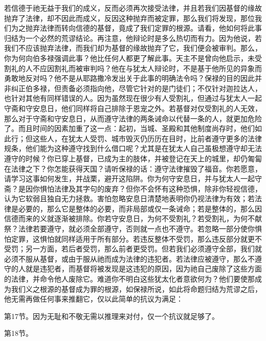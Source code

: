 若信德于祂无益于我们的成义，反而必须再次接受法律，并且若我们因基督的缘故抛弃了法律，却不因此而成义，反因这种抛弃而被定罪，那么我们将发现，那位我们为之抛弃法律而转向信德的基督，竟成了我们定罪的根源。请看，他如何将此事归结为一个必然的荒谬结论。再注意，他辩论时是多么热切而有力。因为他说，若我们不应该抛弃法律，而我们却为基督的缘故抛弃了它，我们便会被审判。那么，你为何向伯多禄强调此事？他比任何人都更了解此事。天主不是曾向他启示，未受割礼的人不应因割礼而被审判吗？他在与犹太人辩论时，不是基于他所见的异象而勇敢地反对吗？他不是从耶路撒冷发出关于此事的明确法令吗？保禄的目的因此并非纠正伯多禄，但责备必须指向他，尽管它针对的是门徒们；不仅针对迦拉达人，也针对其他有同样错误的人。因为虽然现在很少有人受割礼，但通过与犹太人一起守斋和守安息日，他们同样将自己排除于恩宠之外。若基督对仅受割礼的人无效，那么对于守斋和守安息日，从而遵守法律的两条诫命以代替一条的人，就更加危险了。而且时间的因素加重了这一点：起初，当城、圣殿和其他制度尚存时，他们如此行；但这些人，在犹太人受罚、城市毁灭仍历历在目时，比前者遵守更多的法律规条，他们能为这种遵守找到什么借口呢？尤其是在犹太人自己虽极想遵守却无法遵守的时候？你已穿上基督，已成为主的肢体，并被登记在天上的城里，却仍匍匐在法律之下？你怎能获得天国？请听保禄的话：遵守法律摧毁了福音。你若愿意，请学习这事如何发生，并战栗，避开这陷阱。你为何守安息日，并与犹太人一起守斋？是因你惧怕法律及其字句的废弃？但你不会怀有这种恐惧，除非你轻视信德，认为它软弱且独自无力拯救。害怕忽略安息日清楚地表明你仍视法律为有效；若法律是必要的，那么它是整体的必要，而非局部或仅一条诫命；若是整体的，那么因信德而来的义就逐渐被排除。你若守安息日，为何不受割礼？若受割礼，为何不献祭？法律若要遵守，就必须全部遵守，否则就一点也不遵守。若忽略一部分使你惧怕定罪，这惧怕就同样适用于所有部分。若违反整体不受罚，那么违反部分就更不受罚；另一方面，若后者受罚，那么前者更受罚。但若我们必须遵守全部，我们就必须不服从基督，或由于服从祂而成为法律的违犯者。若法律应被遵守，那么不遵守的人就是违犯者，而基督将被发现是这违犯的原因，因为祂自己废除了这些方面的法律，并命令他人废除它。难道你不明白这些犹太化者意欲何为？他们要使那成为我们义之根源的基督成为罪的根源，如保禄所说，如此将命题归结为荒谬之后，他无需再做任何事来推翻它，仅以此简单的抗议为满足：\par

第17节。因为无耻和不敬无需以推理来对付，仅一个抗议就足够了。 \par

第18节。 \par

